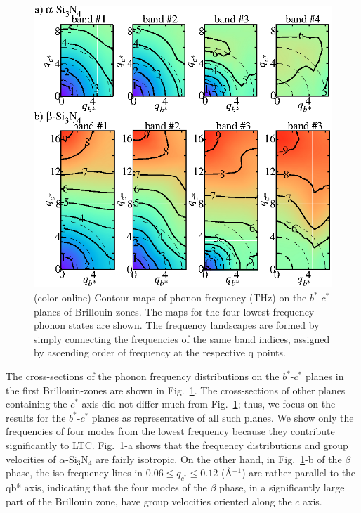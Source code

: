 \documentclass[twocolumn,amsmath,amssymb,a4paper,prb,superscriptaddress,floatfix]{revtex4-1}
\begin{document}
\begin{figure}[ht]
 \centering
  \includegraphics[width=\linewidth]{Fig2_small.eps} \caption{(color
  online) Contour maps of phonon frequency (THz) on the $b^*$-$c^*$
  planes of Brillouin-zones. The maps for the four lowest-frequency
  phonon states are shown. The frequency landscapes are formed by simply
  connecting the frequencies of the same band indices, assigned by
  ascending order of frequency at the respective q
  points. \label{fig:Fig3_338} }
 \centering
\end{figure}

The cross-sections of the phonon frequency distributions on the $b^*$-$c^*$
planes in the first Brillouin-zones are shown in Fig.~\ref{fig:Fig3_338}. 
The cross-sections of other planes containing the $c^*$ axis did not differ
much from Fig.~\ref{fig:Fig3_338}; thus, we focus on the results for the
$b^*$-$c^*$ planes as representative of all such planes. We show only the
frequencies of four modes from the lowest frequency because they contribute
significantly to LTC.
Fig.~\ref{fig:Fig3_338}-a shows that the frequency distributions and group
velocities of $\alpha$-Si$_3$N$_4$ are fairly isotropic. 
On the other hand, in Fig.~\ref{fig:Fig3_338}-b of the $\beta$ phase, the
iso-frequency lines in $0.06 \le q_{c^*} \le 0.12$ (\AA$^{-1}$) are rather
parallel to the qb* axis, indicating that the four modes of the $\beta$ phase,
in a significantly large part of the Brillouin zone, have group velocities
oriented along the $c$ axis.
\end{document}
